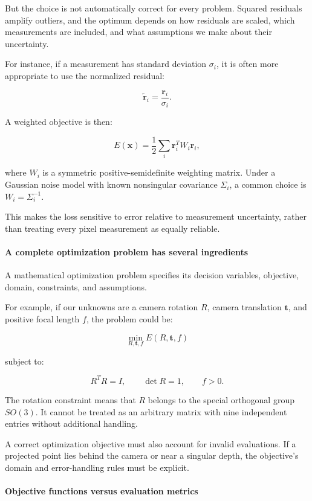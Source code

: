 But the choice is not automatically correct for every problem. Squared residuals amplify outliers, and the optimum depends on how residuals are scaled, which measurements are included, and what assumptions we make about their uncertainty.

For instance, if a measurement has standard deviation \(\sigma_i\), it is often more appropriate to use the normalized residual:

\[
\tilde{\mathbf r}_i= \frac{\mathbf r_i}{\sigma_i}.
\]

A weighted objective is then:

\[
E(\mathbf x)= \frac12\sum_i \mathbf r_i^TW_i\mathbf r_i,
\]

where \(W_i\) is a symmetric positive-semidefinite weighting matrix. Under a Gaussian noise model with known nonsingular covariance \(\Sigma_i\), a common choice is \(W_i=\Sigma_i^{-1}\).

This makes the loss sensitive to error relative to measurement uncertainty, rather than treating every pixel measurement as equally reliable.

\paragraph{A complete optimization problem has several ingredients}\label{02-foundations-ii-ch026-a-complete-optimization-problem-has-several-ingredients}

A mathematical optimization problem specifies its decision variables, objective, domain, constraints, and assumptions.

For example, if our unknowns are a camera rotation \(R\), camera translation \(\mathbf t\), and positive focal length \(f\), the problem could be:

\[
\min_{R,\mathbf t,f}E(R,\mathbf t,f)
\]

subject to:

\[
R^TR=I,\qquad \det R=1,\qquad f>0.
\]

The rotation constraint means that \(R\) belongs to the special orthogonal group \(SO(3)\). It cannot be treated as an arbitrary matrix with nine independent entries without additional handling.

A correct optimization objective must also account for invalid evaluations. If a projected point lies behind the camera or near a singular depth, the objective's domain and error-handling rules must be explicit.

\paragraph{Objective functions versus evaluation metrics}\label{02-foundations-ii-ch026-objective-functions-versus-evaluation-metrics}

